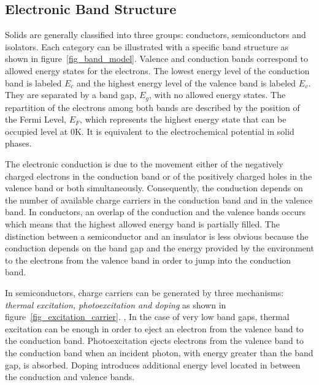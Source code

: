 \subsection{Electronic Band Structure}
    Solids are generally classified into three groups: 
    conductors, semiconductors and isolators. 
    Each category can be illustrated with a specific band structure as shown in 
    figure~\ref{fig_band_model}. 
    Valence and conduction bands correspond to allowed energy states for the electrons. 
    The lowest energy level of the conduction band is labeled $E_c$ and the 
    highest energy level of the valence band is labeled $E_v$. 
    They are separated by a band gap, $E_g$, with no allowed energy states. 
    The repartition of the electrons among both bands are described by the position 
    of the Fermi Level, $E_F$, which represents the highest energy state that 
    can be occupied level at 0K. 
    It is equivalent to the electrochemical potential in solid phases.

    

    The electronic conduction is due to the movement either of the negatively 
    charged electrons in the conduction band or of the positively charged holes 
    in the valence band or both simultaneously. 
    Consequently, the conduction depends on the number of available charge carriers
    in the conduction band and in the valence band. 
    In conductors, an overlap of the conduction and the valence bands occurs 
    which means that the highest allowed energy band is partially filled. 
    The distinction between a semiconductor and an insulator is less obvious 
    because the conduction depends on the band gap and the energy provided by 
    the environment to the electrons from the valence band in order to jump 
    into the conduction band.

    In semiconductors, charge carriers can be generated by three mechanisms: 
    \emph{thermal excitation, photoexcitation and doping} as shown in 
    figure~\ref{fig_excitation_carrier}.  , 
    In the case of very low band gaps, thermal excitation can be enough in order 
    to eject an electron from the valence band to the conduction band. 
    Photoexcitation ejects electrons from the valence band to the conduction 
    band when an incident photon, with energy greater than the band gap, is absorbed. 
    Doping introduces additional energy level located in between the conduction and 
    valence bands.


